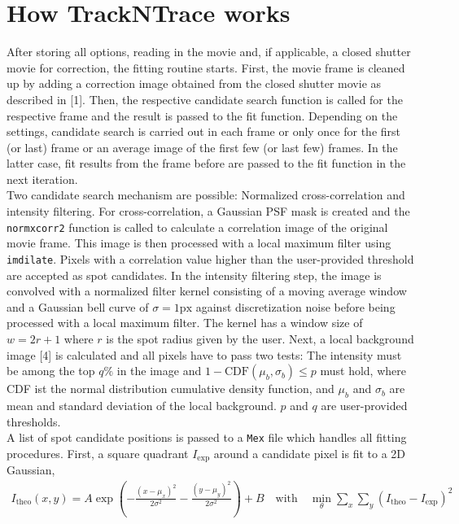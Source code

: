 \documentclass[11pt,onside]{report}
\numberwithin{equation}{chapter}
\begin{document}
\section{How TrackNTrace works}\label{sec:in-depth}
After storing all options, reading in the movie and, if applicable, a closed shutter movie for correction, the fitting routine starts. First, the movie frame is cleaned up by adding a correction image obtained from the closed shutter movie as described in [1]. Then, the respective candidate search function is called for the respective frame and the result is passed to the fit function. Depending on the settings, candidate search is carried out in each frame or only once for the first (or last) frame or an average image of the first few (or last few) frames. In the latter case, fit results from the frame before are passed to the fit function in the next iteration. \\
Two candidate search mechanism are possible: Normalized cross-correlation and intensity filtering. For cross-correlation, a Gaussian PSF mask is created and the \texttt{normxcorr2} function is called to calculate a correlation image of the original movie frame. This image is then processed with a local maximum filter using \texttt{imdilate}. Pixels with a correlation value higher than the user-provided threshold are accepted as spot candidates. In the intensity filtering step, the image is convolved with a normalized filter kernel  consisting of a moving average window and a Gaussian bell curve of $\sigma = \unit{1}{\mathrm{px}}$ against discretization noise before being processed with a local maximum filter. The kernel has a window size of $w = 2r+1$ where $r$ is the spot radius given by the user. Next, a local background image [4] is calculated and all pixels have to pass two tests: The intensity must be among the top $q\%$ in the image and $1-\mathrm{CDF}(\mu_b,\sigma_b) \leq p$ must hold, where CDF ist the normal distribution cumulative density function, and $\mu_b$ and $\sigma_b$ are mean and standard deviation of the local background. $p$ and $q$ are user-provided thresholds.\\[10pt]
A list of spot candidate positions is passed to a \texttt{Mex} file which handles all fitting procedures. First, a square quadrant $I_\mathrm{exp}$ around a candidate pixel is fit to a 2D Gaussian,
\begin{align*}
I_\mathrm{theo}(x,y) = A\exp\left(-\frac{(x-\mu_x)^2}{2\sigma^2} - \frac{(y-\mu_y)^2}{2\sigma^2}\right) + B \quad\mathrm{with}\quad \min_\theta \sum_x\sum_y \left(I_\mathrm{theo}-I_\mathrm{exp}\right)^2
\end{align*}
\end{document}

